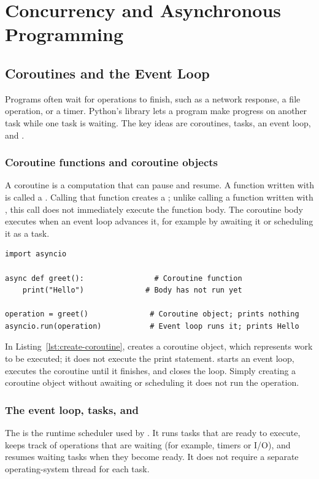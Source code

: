 \chapter[Concurrency and Asynchronous Programming]{Concurrency and Asynchronous\\Programming}
\label{ch:async-programming}
\section{Coroutines and the  Event Loop}
\label{sec:asyncio-coroutines-event-loop}
Programs often wait for operations to finish, such as a network response, a file operation, or a timer. Python's  library lets a program make progress on another task while one task is waiting. The key ideas are coroutines, tasks, an event loop, and .

\subsection{Coroutine functions and coroutine objects}
A coroutine is a computation that can pause and resume. A function written with  is called a . Calling that function creates a ; unlike calling a function written with , this call does not immediately execute the function body. The coroutine body executes when an event loop advances it, for example by awaiting it or scheduling it as a task.

\begin{lstlisting}[caption={Creating a coroutine object versus executing it},label={lst:create-coroutine}]
import asyncio

async def greet():                # Coroutine function
    print("Hello")              # Body has not run yet

operation = greet()              # Coroutine object; prints nothing
asyncio.run(operation)           # Event loop runs it; prints Hello
\end{lstlisting}

In Listing~\ref{lst:create-coroutine},  creates a coroutine object, which represents work to be executed; it does not execute the print statement.  starts an event loop, executes the coroutine until it finishes, and closes the loop. Simply creating a coroutine object without awaiting or scheduling it does not run the operation.

\subsection{The event loop, tasks, and }
The  is the runtime scheduler used by . It runs tasks that are ready to execute, keeps track of operations that are waiting (for example, timers or I/O), and resumes waiting tasks when they become ready. It does not require a separate operating-system thread for each task.

